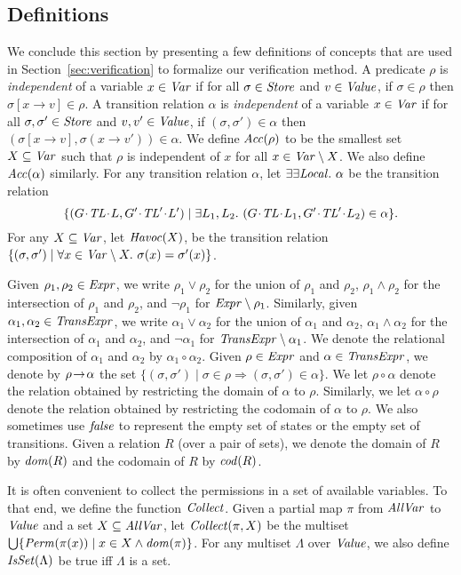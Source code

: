 \subsection{Definitions}
\label{sec:definitions}
We conclude this section by presenting a few definitions of concepts that are used in Section~\ref{sec:verification} to formalize
our verification method.
A predicate $\rho$ is {\em independent\/} of a variable $x \in \mathit{Var}$ if for all $\sigma \in \mathit{Store}$
and $v \in \mathit{Value}$, if $\sigma \in \rho$ then $\sigma[x \rightarrow v] \in \rho$.
A transition relation $\alpha$ is {\em independent\/} of a variable $x \in \mathit{Var}$ if for all $\sigma,\sigma' \in \mathit{Store}$
and $v,v' \in \mathit{Value}$, if $(\sigma,\sigma') \in \alpha$ then $(\sigma[x \rightarrow v], \sigma(x \rightarrow v')) \in \alpha$.
We define $\mathit{Acc}(\rho)$ to be the smallest set $X \subseteq \mathit{Var}$ such that $\rho$
is independent of $x$ for all $x \in \mathit{Var} \setminus X$.
We also define $\mathit{Acc}(\alpha)$ similarly.
For any transition relation $\alpha$, let $\exists\exists {\mathit{Local}}.\ \alpha$ be the transition relation
\[\{(\MakeStore{\varsG}{\varsTL}{\varsL}, \MakeStore{\varsG'}{\varsTL'}{\varsL'}) \mid \exists \varsL_1,\varsL_2.\ (\MakeStore{\varsG}{\varsTL}{\varsL_1}, \MakeStore{\varsG'}{\varsTL'}{\varsL_2}) \in \alpha \}.\]
For any $X \subseteq \mathit{Var}$, let $\mathit{Havoc}(X)$, be the transition relation 
$\{(\sigma,\sigma') \mid \forall x \in \mathit{Var} \setminus X.\ \sigma(x) = \sigma'(x)\}$.

Given $\rho_1, \rho_2 \in \mathit{Expr}$, we write $\rho_1 \vee \rho_2$ for the union of $\rho_1$ and $\rho_2$, 
$\rho_1 \wedge \rho_2$ for the intersection of $\rho_1$ and $\rho_2$, and $\neg \rho_1$ for $\mathit{Expr} \setminus \rho_1$.
Similarly, given $\alpha_1, \alpha_2 \in \mathit{TransExpr}$, we write $\alpha_1 \vee \alpha_2$ for the union of $\alpha_1$ and $\alpha_2$, 
$\alpha_1 \wedge \alpha_2$ for the intersection of $\alpha_1$ and $\alpha_2$, and $\neg \alpha_1$ for $\mathit{TransExpr} \setminus \alpha_1$.
We denote the relational composition of $\alpha_1$ and $\alpha_2$ by $\alpha_1 \circ \alpha_2$.
Given $\rho \in \mathit{Expr}$ and $\alpha \in \mathit{TransExpr}$, we denote by ${\rho}\!\rightarrow\!{\alpha}$ the
set $\{(\sigma, \sigma') \mid \sigma \in \rho \Rightarrow (\sigma,\sigma') \in \alpha\}$.
We let $\rho \circ \alpha$ denote the relation obtained by restricting the domain of $\alpha$ to $\rho$.
Similarly, we let $\alpha \circ \rho$ denote the relation obtained by restricting the codomain of $\alpha$ to $\rho$.
We also sometimes use $\mathit{false}$ to represent the empty set of states or the empty set of transitions.
Given a relation $R$ (over a pair of sets), we denote the domain of $R$ by $\mathit{dom}(R)$ and the codomain of $R$ by $\mathit{cod}(R)$.

It is often convenient to collect the permissions in a set of available variables.
To that end, we define the function $\mathit{Collect}$.
Given a partial map $\pi$ from $\mathit{AllVar}$ to $\mathit{Value}$ and a set $X \subseteq \mathit{AllVar}$,
let $\mathit{Collect}(\pi,X)$ be the multiset $\bigcup \{\mathit{Perm}(\pi(x)) \mid x \in X \wedge \mathit{dom}(\pi)\}$.
For any multiset $\Lambda$ over $\mathit{Value}$, we also define $\mathit{IsSet}(\Lambda)$ be true iff $\Lambda$ is a set.
